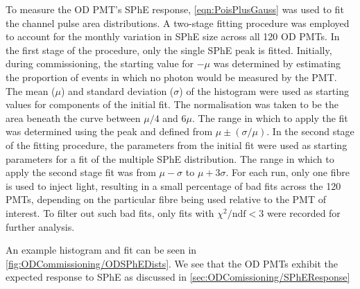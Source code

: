 To measure the OD PMT's SPhE response, \autoref{eqn:PoisPlusGauss} was used to fit the channel pulse area distributions. A two-stage fitting procedure was employed to account for the monthly variation in SPhE size across all 120 OD PMTs. In the first stage of the procedure, only the single SPhE peak is fitted. Initially, during commissioning, the starting value for $-\mu$ was determined by estimating the proportion of events in which no photon would be measured by the PMT. The mean ($\mu$) and standard deviation ($\sigma$) of the histogram were used as starting values for components of the initial fit. The normalisation was taken to be the area beneath the curve between $\mu/4$ and $6\mu$. The range in which to apply the fit was determined using the peak and defined from $\mu\pm(\sigma/\mu)$. In the second stage of the fitting procedure, the parameters from the initial fit were used as starting parameters for a fit of the multiple SPhE distribution. The range in which to apply the second stage fit was from $\mu-\sigma$ to $\mu+3\sigma$. For each run, only one fibre is used to inject light, resulting in a small percentage of bad fits across the 120 PMTs, depending on the particular fibre being used relative to the PMT of interest. To filter out such bad fits, only fits with $\chi^2/\text{ndf}<3$ were recorded for further analysis.

An example histogram and fit can be seen in \autoref{fig:ODCommissioning/ODSPhEDists}. We see that the OD PMTs exhibit the expected response to SPhE as discussed in \autoref{sec:ODComissioning/SPhEResponse}

